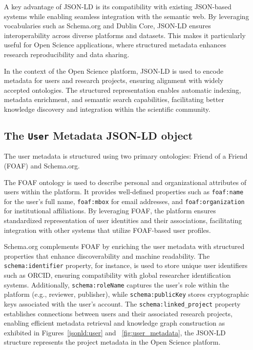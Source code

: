 \documentclass{article}
\begin{document}
A key advantage of JSON-LD is its compatibility with existing JSON-based systems while enabling seamless integration with the semantic web. By leveraging vocabularies such as Schema.org and Dublin Core, JSON-LD ensures interoperability across diverse platforms and datasets. This makes it particularly useful for Open Science applications, where structured metadata enhances research reproducibility and data sharing.

In the context of the Open Science platform, JSON-LD is used to encode metadata for users and research projects, ensuring alignment with widely accepted ontologies. The structured representation enables automatic indexing, metadata enrichment, and semantic search capabilities, facilitating better knowledge discovery and integration within the scientific community.


\subsection{The \texttt{User} Metadata JSON-LD object}

The user metadata is structured using two primary ontologies: Friend of a Friend (FOAF) and Schema.org.

The FOAF ontology is used to describe personal and organizational attributes of users within the platform. It provides well-defined properties such as \texttt{foaf:name} for the user’s full name, \texttt{foaf:mbox} for email addresses, and \texttt{foaf:organization} for institutional affiliations. By leveraging FOAF, the platform ensures standardized representation of user identities and their associations, facilitating integration with other systems that utilize FOAF-based user profiles.

Schema.org complements FOAF by enriching the user metadata with structured properties that enhance discoverability and machine readability. The \texttt{schema:identifier} property, for instance, is used to store unique user identifiers such as ORCID, ensuring compatibility with global researcher identification systems. Additionally, \texttt{schema:roleName} captures the user’s role within the platform (e.g., reviewer, publisher), while \texttt{schema:publicKey} stores cryptographic keys associated with the user’s account. The \texttt{schema:linked\_project} property establishes connections between users and their associated research projects, enabling efficient metadata retrieval and knowledge graph construction as exhibited in Figures~\ref{jsonld:user} and ~\ref{fig:user_metadata}, the JSON-LD structure represents the project metadata in the Open Science platform.
\end{document}
